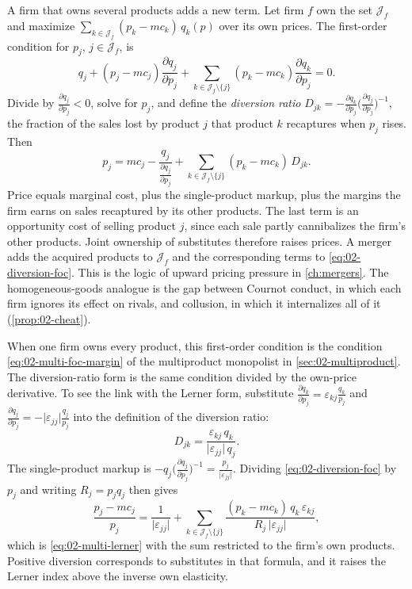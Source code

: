A firm that owns several products adds a new term. Let firm $f$ own the set $\mathcal{J}_f$ and maximize
$\sum_{k \in \mathcal{J}_f}(p_k - mc_k)\,q_k(p)$ over its own prices. The first-order condition for $p_j$,
$j \in \mathcal{J}_f$, is
\begin{equation*}
q_j + (p_j - mc_j)\frac{\partial q_j}{\partial p_j} + \sum_{k \in \mathcal{J}_f\setminus\{j\}}(p_k - mc_k)\frac{\partial q_k}{\partial p_j} = 0 .
\end{equation*}
Divide by $\frac{\partial q_j}{\partial p_j} < 0$, solve for $p_j$, and define the \emph{diversion ratio}
$D_{jk} = -\frac{\partial q_k}{\partial p_j}\bigl(\frac{\partial q_j}{\partial p_j}\bigr)^{-1}$, the fraction of the sales lost by
product $j$ that product $k$ recaptures when $p_j$ rises. Then
\begin{equation}\label{eq:02-diversion-foc}
p_j = mc_j - \frac{q_j}{\frac{\partial q_j}{\partial p_j}} + \sum_{k \in \mathcal{J}_f\setminus\{j\}}(p_k - mc_k)\,D_{jk} .
\end{equation}
Price equals marginal cost, plus the single-product markup, plus the margins the firm earns on sales recaptured by
its other products. The last term is an opportunity cost of selling product $j$, since each sale partly
cannibalizes the firm's other products. Joint ownership of substitutes therefore raises prices. A merger adds the
acquired products to $\mathcal{J}_f$ and the corresponding terms to \eqref{eq:02-diversion-foc}. This is the logic
of upward pricing pressure in \cref{ch:mergers}. The homogeneous-goods analogue is the gap between Cournot conduct,
in which each firm ignores its effect on rivals, and collusion, in which it internalizes all of it
(\cref{prop:02-cheat}).

When one firm owns every product, this first-order condition is the condition \eqref{eq:02-multi-foc-margin} of the
multiproduct monopolist in \cref{sec:02-multiproduct}. The diversion-ratio form is the same condition divided by
the own-price derivative. To see the link with the Lerner form, substitute $\frac{\partial q_k}{\partial p_j} =
\varepsilon_{kj}\frac{q_k}{p_j}$ and $\frac{\partial q_j}{\partial p_j} = -\lvert\varepsilon_{jj}\rvert\frac{q_j}{p_j}$
into the definition of the diversion ratio:
\[
  D_{jk} = \frac{\varepsilon_{kj}\,q_k}{\lvert\varepsilon_{jj}\rvert\,q_j} .
\]
The single-product markup is $-q_j\bigl(\frac{\partial q_j}{\partial p_j}\bigr)^{-1} =
\frac{p_j}{\lvert\varepsilon_{jj}\rvert}$.
Dividing \eqref{eq:02-diversion-foc} by $p_j$ and writing $R_j = p_jq_j$ then gives
\[
  \frac{p_j - mc_j}{p_j} = \frac{1}{\lvert\varepsilon_{jj}\rvert}
  + \sum_{k \in \mathcal{J}_f\setminus\{j\}}\frac{(p_k - mc_k)\,q_k\,\varepsilon_{kj}}{R_j\,\lvert\varepsilon_{jj}\rvert} ,
\]
which is \eqref{eq:02-multi-lerner} with the sum restricted to the firm's own products. Positive diversion
corresponds to substitutes in that formula, and it raises the Lerner index above the inverse own elasticity.

